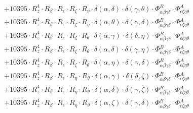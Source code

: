 \documentclass{article}
\begin{document}
\begin{equation}
\begin{array}{c}
 \\[0.2em] 		 + 10395 \cdot R_{z}^{4} \cdot R_{\beta{}} \cdot R_{\epsilon{}} \cdot R_{\zeta{}} \cdot R_{\eta{}} \cdot \delta{}\left(\alpha{}, \delta{}\right) \cdot \delta{}\left(\gamma{}, \theta{}\right) \cdot \Phi{}^{B}_{\alpha{}\beta{}\gamma{}\delta{}} \cdot \Phi{}^{A}_{\epsilon{}\zeta{}\eta{}\theta{}} 
 \\[0.2em] 		 + 10395 \cdot R_{z}^{4} \cdot R_{\beta{}} \cdot R_{\epsilon{}} \cdot R_{\zeta{}} \cdot R_{\eta{}} \cdot \delta{}\left(\alpha{}, \theta{}\right) \cdot \delta{}\left(\gamma{}, \delta{}\right) \cdot \Phi{}^{B}_{\alpha{}\beta{}\gamma{}\delta{}} \cdot \Phi{}^{A}_{\epsilon{}\zeta{}\eta{}\theta{}} 
 \\[0.2em] 		 + 10395 \cdot R_{z}^{4} \cdot R_{\beta{}} \cdot R_{\epsilon{}} \cdot R_{\zeta{}} \cdot R_{\theta{}} \cdot \delta{}\left(\alpha{}, \gamma{}\right) \cdot \delta{}\left(\delta{}, \eta{}\right) \cdot \Phi{}^{B}_{\alpha{}\beta{}\gamma{}\delta{}} \cdot \Phi{}^{A}_{\epsilon{}\zeta{}\eta{}\theta{}} 
 \\[0.2em] 		 + 10395 \cdot R_{z}^{4} \cdot R_{\beta{}} \cdot R_{\epsilon{}} \cdot R_{\zeta{}} \cdot R_{\theta{}} \cdot \delta{}\left(\alpha{}, \delta{}\right) \cdot \delta{}\left(\gamma{}, \eta{}\right) \cdot \Phi{}^{B}_{\alpha{}\beta{}\gamma{}\delta{}} \cdot \Phi{}^{A}_{\epsilon{}\zeta{}\eta{}\theta{}} 
 \\[0.2em] 		 + 10395 \cdot R_{z}^{4} \cdot R_{\beta{}} \cdot R_{\epsilon{}} \cdot R_{\zeta{}} \cdot R_{\theta{}} \cdot \delta{}\left(\alpha{}, \eta{}\right) \cdot \delta{}\left(\gamma{}, \delta{}\right) \cdot \Phi{}^{B}_{\alpha{}\beta{}\gamma{}\delta{}} \cdot \Phi{}^{A}_{\epsilon{}\zeta{}\eta{}\theta{}} 
 \\[0.2em] 		 + 10395 \cdot R_{z}^{4} \cdot R_{\beta{}} \cdot R_{\epsilon{}} \cdot R_{\eta{}} \cdot R_{\theta{}} \cdot \delta{}\left(\alpha{}, \gamma{}\right) \cdot \delta{}\left(\delta{}, \zeta{}\right) \cdot \Phi{}^{B}_{\alpha{}\beta{}\gamma{}\delta{}} \cdot \Phi{}^{A}_{\epsilon{}\zeta{}\eta{}\theta{}} 
 \\[0.2em] 		 + 10395 \cdot R_{z}^{4} \cdot R_{\beta{}} \cdot R_{\epsilon{}} \cdot R_{\eta{}} \cdot R_{\theta{}} \cdot \delta{}\left(\alpha{}, \delta{}\right) \cdot \delta{}\left(\gamma{}, \zeta{}\right) \cdot \Phi{}^{B}_{\alpha{}\beta{}\gamma{}\delta{}} \cdot \Phi{}^{A}_{\epsilon{}\zeta{}\eta{}\theta{}} 
 \\[0.2em] 		 + 10395 \cdot R_{z}^{4} \cdot R_{\beta{}} \cdot R_{\epsilon{}} \cdot R_{\eta{}} \cdot R_{\theta{}} \cdot \delta{}\left(\alpha{}, \zeta{}\right) \cdot \delta{}\left(\gamma{}, \delta{}\right) \cdot \Phi{}^{B}_{\alpha{}\beta{}\gamma{}\delta{}} \cdot \Phi{}^{A}_{\epsilon{}\zeta{}\eta{}\theta{}} 

\end{array}
\end{equation}
\end{document}
